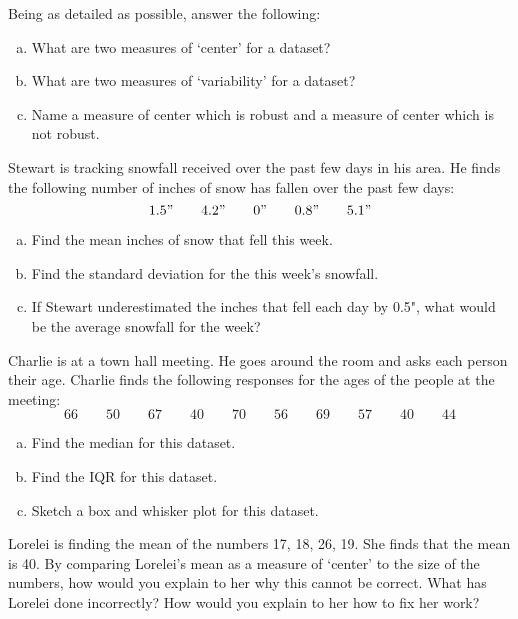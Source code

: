 \documentclass[11pt,letterpaper]{article}
\begin{document}

 Being as detailed as possible, answer the following:
	\begin{enumerate}[(a)]
	\item What are two measures of `center' for a dataset? 
	\item What are two measures of `variability' for a dataset?
	\item Name a measure of center which is robust and a measure of center which is not robust. 
	\end{enumerate}



\newpage



 Stewart is tracking snowfall received over the past few days in his area. He finds the following number of inches of snow has fallen over the past few days:
	\[
	1.5" \qquad 4.2" \qquad 0" \qquad 0.8" \qquad 5.1"
	\]

\begin{enumerate}[(a)]
\item Find the mean inches of snow that fell this week.
\item Find the standard deviation for the this week's snowfall. 
\item If Stewart underestimated the inches that fell each day by 0.5", what would be the average snowfall for the week?
\end{enumerate}



\newpage



 Charlie is at a town hall meeting. He goes around the room and asks each person their age. Charlie finds the following responses for the ages of the people at the meeting:
	\[
	66 \qquad 50 \qquad 67 \qquad 40 \qquad 70 \qquad 56 \qquad 69 \qquad 57 \qquad 40 \qquad 44
	\]

\begin{enumerate}[(a)]
\item Find the median for this dataset. 
\item Find the IQR for this dataset.
\item Sketch a box and whisker plot for this dataset. 
\end{enumerate}



\newpage



 Lorelei is finding the mean of the numbers 17, 18, 26, 19. She finds that the mean is 40. By comparing Lorelei's mean as a measure of `center' to the size of the numbers, how would you explain to her why this cannot be correct. What has Lorelei done incorrectly? How would you explain to her how to fix her work? 
\end{document}
